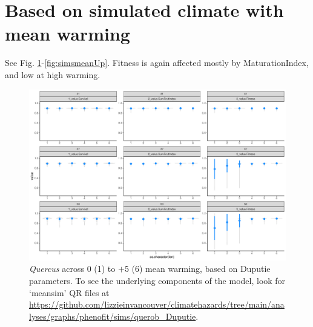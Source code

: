 \documentclass[11pt,letter]{article}
\begin{document}
\clearall
\section*{Based on simulated climate with mean warming}

See Fig. \ref{fig:simsmeanDup}-\ref{fig:simsmeanUp}. Fitness is again affected mostly by MaturationIndex, and low at high warming.

\begin{figure}[h!]
 \begin{center}
\noindent \includegraphics[width=1\textwidth]{..//analyses/graphs/phenofit/sims/querob_Duputie/meansim_3metricsQR.pdf}
  \caption{\emph{Quercus} across 0 (1) to $+$5 (6) mean warming, based on Duputie parameters. To see the underlying components of the model, look for `meansim' QR files at \url{https://github.com/lizzieinvancouver/climatehazards/tree/main/analyses/graphs/phenofit/sims/querob_Duputie}.}
  \label{fig:simsmeanDup}
  \end{center}
\end{figure}
\end{document}
